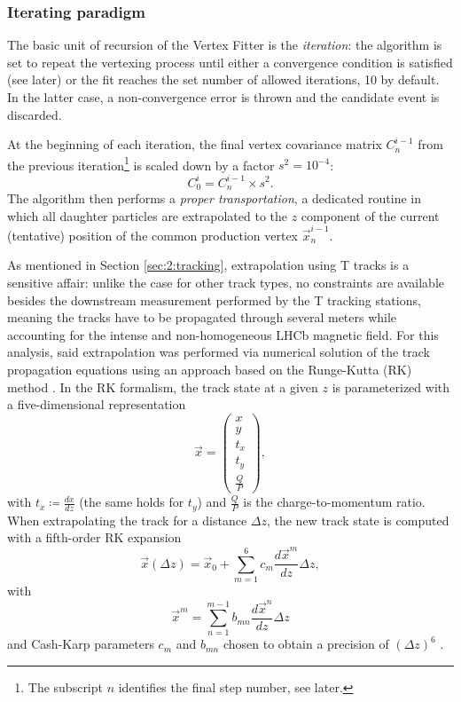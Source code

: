 \subsubsection{Iterating paradigm}
The basic unit of recursion of the Vertex Fitter is the \textit{iteration}:
the algorithm is set to repeat the vertexing process until either a convergence condition is satisfied (see later) or the fit reaches the set number of allowed iterations, 10 by default.
In the latter case, a non-convergence error is thrown and the candidate event is discarded.

At the beginning of each iteration, the final vertex covariance matrix $C^{i-1}_n$ from the previous iteration\footnote{The subscript $n$ identifies the final step number, see later.} is scaled down by a factor $s^2 = {10}^{-4}$:
\begin{equation}
	C^{i}_0 = C^{i-1}_n \times s^2.
\end{equation}
The algorithm then performs a \textit{proper transportation}, a dedicated routine in which all daughter particles are extrapolated to the $z$ component of the current (tentative) position of the common production vertex $\vec{x}_n^{i-1}$.

As mentioned in Section \ref{sec:2:tracking}, extrapolation using T tracks is a sensitive affair:
unlike the case for other track types, no constraints are available besides the downstream measurement performed by the T tracking stations, meaning the tracks have to be propagated through several meters while accounting for the intense and non-homogeneous LHCb magnetic field.
For this analysis, said extrapolation was performed via numerical solution of the track propagation equations using an approach based on the Runge-Kutta (RK) method \cite{Hairer1993}.
In the RK formalism, the track state at a given $z$ is parameterized with a five-dimensional representation
\begin{equation}
\vec{x} = \begin{pmatrix}
	x \\ y \\ t_x \\ t_y \\ \frac{Q}{P}
\end{pmatrix},
\end{equation}
with $t_{x} \coloneqq \frac{dx}{dz}$ (the same holds for $t_y$) and $\frac{Q}{P}$ is the charge-to-momentum ratio.
When extrapolating the track for a distance $\Delta z$, the new track state is computed with a fifth-order RK expansion
\begin{equation}
\vec{x}(\Delta z) = \vec{x}_0 + \sum_{m=1}^6 c_m \frac{d\vec{x}^m}{dz} \Delta z,
\end{equation}
with
\begin{equation}
\vec{x}^m = \sum_{n=1}^{m-1} b_{mn} \frac{d\vec{x}^n}{dz} \Delta z
\end{equation}
and Cash-Karp parameters $c_m$ and $b_{mn}$ chosen to obtain a precision of $(\Delta z)^6$ \cite{Bos:1070314}.



